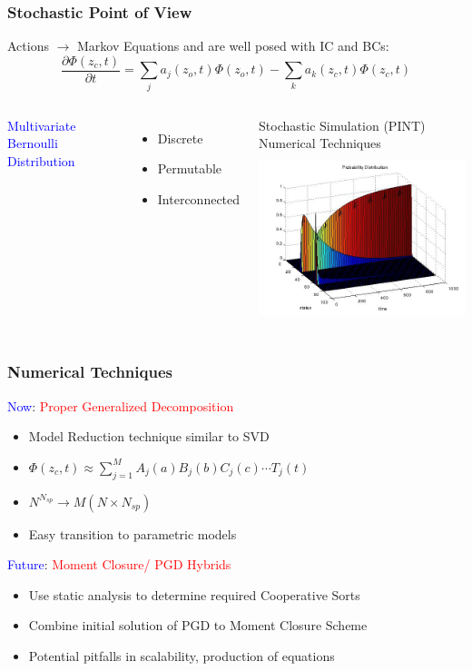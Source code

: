 
\begin{frame}
 \frametitle{Stochastic Point of View}
 Actions $\rightarrow$ Markov Equations and are well posed with IC and BCs:
    \[
\frac{\partial \Phi(z_c,t)}{\partial t} = \sum_j  a_j(z_o,t)\Phi(z_o,t) -\sum_k a_k(z_c,t)\Phi(z_c,t)
\]
\begin{columns}
 \textcolor{blue}{Multivariate Bernoulli Distribution}
 \begin{itemize}
  \item Discrete
  \item Permutable
  \item Interconnected
 \end{itemize}
 Stochastic Simulation (PINT)\\
 Numerical Techniques
  \includegraphics[trim=0mm 0mm -50mm 0mm, width=70mm,height=50mm]{../figures/MH_probab_plot.jpg}
\hfill
\end{columns}

\end{frame}


\begin{frame}
 \frametitle{Numerical Techniques}
 \textcolor{blue}{Now}: \textcolor{red}{Proper Generalized Decomposition}
 \begin{itemize}
 \item Model Reduction technique similar to SVD
  \item $\Phi(z_c,t) \approx \sum\limits^{M}_{j=1}A_j(a) B_j(b)  C_j(c)\cdots T_j(t)$
  \item $N^{N_{sp}}\rightarrow M\left( N\times N_{sp} \right)$
  \item Easy transition to parametric models
 \end{itemize}
 \vspace{1cm}
\textcolor{blue}{Future}: \textcolor{red}{Moment Closure/ PGD Hybrids}
\begin{itemize}
 \item Use static analysis to determine required Cooperative Sorts
 \item Combine initial solution of PGD to Moment Closure Scheme
 \item Potential pitfalls in scalability, production of equations
\end{itemize}


\end{frame}
